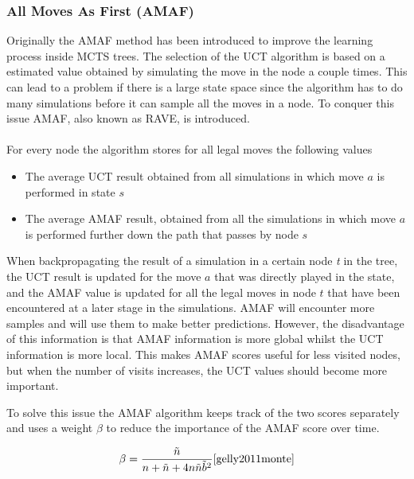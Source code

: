 \documentclass{ba-kecs}
\begin{document}
\subsubsection{All Moves As First (AMAF)}
Originally the AMAF method has been introduced to improve the learning process inside MCTS trees. The selection of the UCT algorithm is based on a estimated value obtained by simulating the move in the node a couple times. This can lead to a problem if there is a large state space since the algorithm has to do many simulations before it can sample all the moves in a node. To conquer this issue AMAF, also known as RAVE, is introduced.\\
\\
For every node the algorithm stores for all legal moves the following values 
\begin{itemize}
	\item The average UCT result obtained from all simulations in which move $a$ is performed in state $s$
	\item The average AMAF result, obtained from all the simulations in which move $a$ is performed further down the path that passes by node $s$
\end{itemize}



When backpropagating the result of a simulation in a certain node \textit{t} in the tree, the UCT result is updated for the move $a$ that was directly played in the state, and the AMAF value is updated for all the legal moves in node $t$ that have been encountered at a later stage in the simulations. AMAF will encounter more samples and will use them to make better predictions. However, the disadvantage of this information is that AMAF information is more global whilst the UCT information is more local. This makes AMAF scores useful for less visited nodes, but when the number of visits increases, the UCT values should become more important. \cite{sironicomparison}


To solve this issue the AMAF algorithm keeps track of the two scores separately and uses a weight $\beta$ to reduce the importance of the AMAF score over time. 


\begin{center}
	\label{Beta}
	\begin{equation}
    \beta = \frac{\tilde{n}}{n+\tilde{n} + 4n\tilde{n}\tilde{b}^2} 	\cite{gelly2011monte}
	\end{equation}
\end{center}
\end{document}
